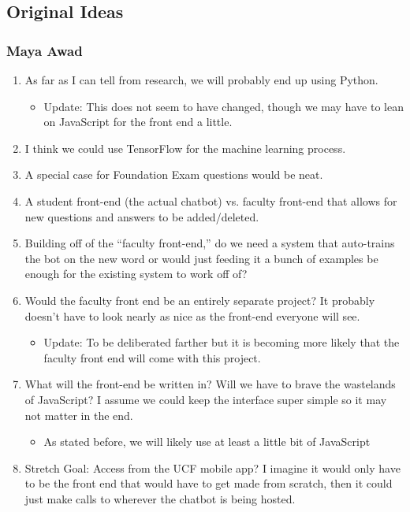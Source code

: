 \documentclass[titlepage, 12pt]{article}
\begin{document}
 


\subsection{Original Ideas}

\subsubsection{Maya Awad}

\begin{enumerate}
    \item As far as I can tell from research, we will probably end up using Python.
    \begin{itemize}
        \item Update: This does not seem to have changed, though we may have to lean on JavaScript for the front end a little.
    \end{itemize}
    \item I think we could use TensorFlow for the machine learning process.
    \item A special case for Foundation Exam questions would be neat.
    \item A student front-end (the actual chatbot) vs. faculty front-end that allows for new questions and answers to be added/deleted.
    \item Building off of the “faculty front-end,” do we need a system that auto-trains the bot on the new word or would just feeding it a bunch of examples be enough for the existing system to work off of?
    \item Would the faculty front end be an entirely separate project? It probably doesn’t have to look nearly as nice as the front-end everyone will see.
    \begin{itemize}
        \item Update: To be deliberated farther but it is becoming more likely that the faculty front end will come with this project.
    \end{itemize}
    \item What will the front-end be written in? Will we have to brave the wastelands of JavaScript? I assume we could keep the interface super simple so it may not matter in the end.
    \begin{itemize}
        \item As stated before, we will likely use at least a little bit of JavaScript
    \end{itemize}
    \item Stretch Goal: Access from the UCF mobile app? I imagine it would only have to be the front end that would have to get made from scratch, then it could just make calls to wherever the chatbot is being hosted. 

\end{enumerate}
\end{document}
